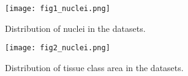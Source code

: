 \documentclass[../main.tex]{subfiles}
\begin{document}
\begin{frame}[c]

    \begin{figure}[h]
        \centering
        \texttt{[image: fig1\_nuclei.png]}
        \caption{Distribution of nuclei in the datasets.}
    \end{figure}

\end{frame}

\begin{frame}[c]

    \begin{figure}[h]
        \centering
        \texttt{[image: fig2\_nuclei.png]}
        \caption{Distribution of tissue class area in the datasets.}
    \end{figure}

\end{frame}
\end{document}

